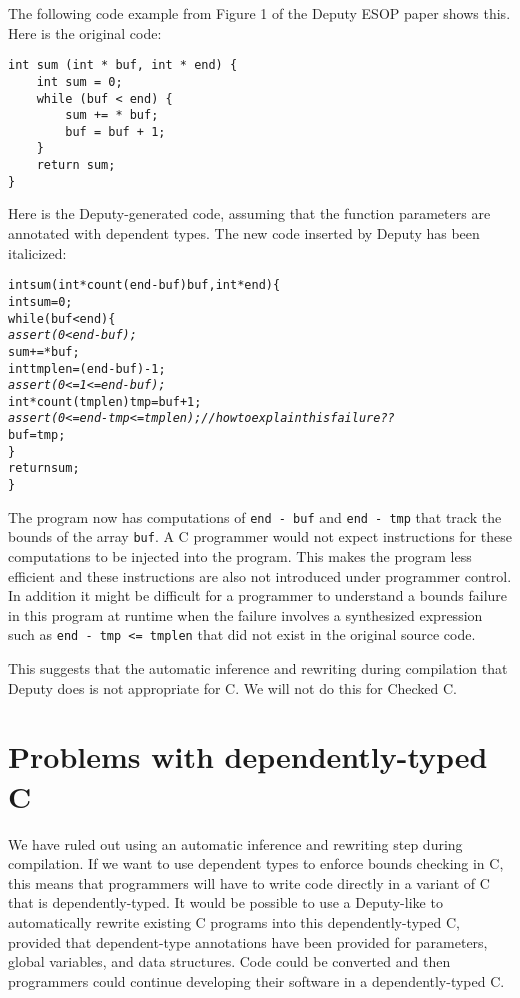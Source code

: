 The following code example from Figure 1 of the Deputy ESOP paper shows
this. Here is the original code:
\begin{verbatim}
int sum (int * buf, int * end) {
    int sum = 0;
    while (buf < end) {
        sum += * buf;
        buf = buf + 1;
    }
    return sum;
}
\end{verbatim}

Here is the Deputy-generated code, assuming that the function parameters
are annotated with dependent types. The new code inserted by Deputy has
been italicized:

\begin{alltt}
int sum (int * count(end - buf) buf, int * end) \{
    int sum = 0;
    while (buf < end) \{
        \textit{assert(0 < end - buf);}
        sum += * buf;
        int tmplen = (end - buf) - 1;
        \textit{assert(0 <= 1 <= end - buf);}
        int * count(tmplen) tmp = buf + 1;
        \textit{assert(0 <= end - tmp <= tmplen);  // how to explain this failure??}
        buf = tmp;
    \}
    return sum;
\}
\end{alltt}

The program now has computations of \texttt{end - buf} and \texttt{end
- tmp} that track the bounds of the array \texttt{buf}. A C programmer
would not expect instructions for these computations to be injected into
the program. This makes the program less efficient and these
instructions are also not introduced under programmer control. In
addition it might be difficult for a programmer to understand a bounds
failure in this program at runtime when the failure involves a
synthesized expression such as \verb|end - tmp <= tmplen| that did not
exist in the original source code.

This suggests that the automatic inference and rewriting during
compilation that Deputy does is not appropriate for C. We will not do
this for Checked C.

\section{Problems with dependently-typed {C}}

We have ruled out using an automatic inference and rewriting step during
compilation. If we want to use dependent types to enforce bounds
checking in C, this means that programmers will have to write code
directly in a variant of C that is dependently-typed. It would be
possible to use a Deputy-like to automatically rewrite existing C
programs into this dependently-typed C, provided that dependent-type
annotations have been provided for parameters, global variables, and
data structures. Code could be converted and then programmers could
continue developing their software in a dependently-typed C.

